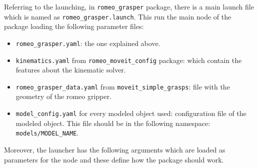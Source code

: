 \documentclass[12pt,a4paper,final,twoside,openright]{report}
\begin{document}
%
%

Referring to the launching, in \texttt{romeo\_grasper} package, there is a main launch file which is named as \texttt{romeo\_grasper.launch}. This run the main node of the package loading the following parameter files:

\begin{itemize}
\item \texttt{romeo\_grasper.yaml}: the one explained above.
\item \texttt{kinematics.yaml} from \texttt{romeo\_moveit\_config} package: which contain the features about the kinematic solver.
\item \texttt{romeo\_grasper\_data.yaml} from \texttt{moveit\_simple\_grasps}: file with the geometry of the romeo gripper. 
\item \texttt{model\_config.yaml} for every modeled object used: configuration file of the modeled object. This file should be in the following namespace: \texttt{models/MODEL\_NAME}.
\end{itemize}

Moreover, the launcher has the following arguments which are loaded as parameters for the node and these define how the package should work.
\end{document}

